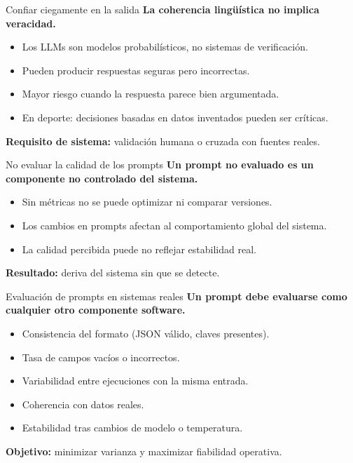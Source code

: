 \documentclass[aspectratio=169]{beamer}
\begin{document}
\begin{frame}{Confiar ciegamente en la salida}
\textbf{La coherencia lingüística no implica veracidad.}
\vspace{0.4em}
\begin{itemize}
    \item Los LLMs son modelos probabilísticos, no sistemas de verificación.
    \item Pueden producir respuestas seguras pero incorrectas.
    \item Mayor riesgo cuando la respuesta parece bien argumentada.
    \item En deporte: decisiones basadas en datos inventados pueden ser críticas.
\end{itemize}
\vspace{0.4em}
\textbf{Requisito de sistema:} validación humana o cruzada con fuentes reales.
\end{frame}

\begin{frame}{No evaluar la calidad de los prompts}
\textbf{Un prompt no evaluado es un componente no controlado del sistema.}
\vspace{0.4em}
\begin{itemize}
    \item Sin métricas no se puede optimizar ni comparar versiones.
    \item Los cambios en prompts afectan al comportamiento global del sistema.
    \item La calidad percibida puede no reflejar estabilidad real.
\end{itemize}
\vspace{0.4em}
\textbf{Resultado:} deriva del sistema sin que se detecte.
\end{frame}

\begin{frame}{Evaluación de prompts en sistemas reales}
\textbf{Un prompt debe evaluarse como cualquier otro componente software.}
\vspace{0.4em}
\begin{itemize}
    \item Consistencia del formato (JSON válido, claves presentes).
    \item Tasa de campos vacíos o incorrectos.
    \item Variabilidad entre ejecuciones con la misma entrada.
    \item Coherencia con datos reales.
    \item Estabilidad tras cambios de modelo o temperatura.
\end{itemize}
\vspace{0.4em}
\textbf{Objetivo:} minimizar varianza y maximizar fiabilidad operativa.
\end{frame}
\end{document}

